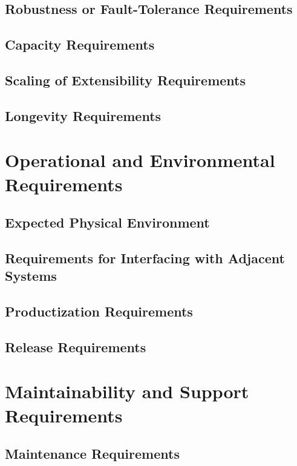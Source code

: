 \documentclass{scrreprt}
\begin{document}
\subsection{Robustness or Fault-Tolerance Requirements}

\subsection{Capacity Requirements}

\subsection{Scaling of Extensibility Requirements}

\subsection{Longevity Requirements}

\section{Operational and Environmental Requirements}

\subsection{Expected Physical Environment}

\subsection{Requirements for Interfacing with Adjacent Systems}

\subsection{Productization Requirements}

\subsection{Release Requirements}

\section{Maintainability and Support Requirements}

\subsection{Maintenance Requirements}
\end{document}
